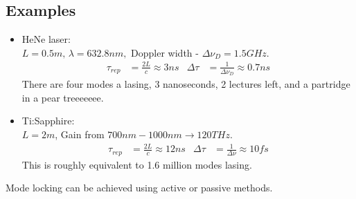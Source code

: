 \documentclass[a4paper, 11pt, normalem]{report}
\begin{document}
\subsection{Examples}
\begin{itemize}
    \item HeNe laser:\\
        $L=0.5m,\,\lambda = 632.8nm,$ Doppler width - $\Delta\nu_D = 1.5GHz$.
        \begin{align}
            \tau_{rep} &= \frac{2L}{c} \approx 3ns &
            \Delta\tau &= \frac{1}{\Delta\nu_D} \approx 0.7ns
        \end{align}
        There are four modes a lasing, 3 nanoseconds, 2 lectures left, and a partridge in a pear treeeeeee.
    \item Ti:Sapphire:\\
        $L=2m$, Gain from $700nm-1000nm \to 120 THz$.
        \begin{align}
            \tau_{rep} &= \frac{2L}{c} \approx 12ns &
            \Delta\tau &= \frac{1}{\Delta\nu} \approx 10fs
        \end{align}
        This is roughly equivalent to 1.6 million modes lasing.
\end{itemize}
Mode locking can be achieved using active or passive methods.
\end{document}
